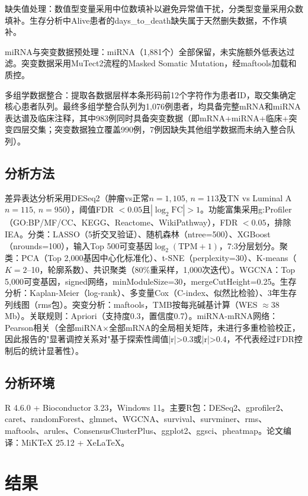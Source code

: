 \documentclass[12pt,a4paper,openany]{ctexbook}
\begin{document}
缺失值处理：数值型变量采用中位数填补以避免异常值干扰，分类型变量采用众数填补。生存分析中Alive患者的days\_to\_death缺失属于天然删失数据，不作填补。

miRNA与突变数据预处理：miRNA（1,881个）全部保留，未实施额外低表达过滤。突变数据采用MuTect2流程的Masked Somatic Mutation，经maftools\cite{mayakonda2018maftools}加载和质控。

多组学数据整合：提取各数据层样本条形码前12个字符作为患者ID，取交集确定核心患者队列。最终多组学整合队列为1,076例患者，均具备完整mRNA和miRNA表达谱及临床注释，其中983例同时具备突变数据（即mRNA+miRNA+临床+突变四层交集；突变数据独立覆盖990例，7例因缺失其他组学数据而未纳入整合队列）。

\section{分析方法}
差异表达分析采用DESeq2\cite{love2014moderated}（肿瘤vs正常$n=1,105$, $n=113$及TN vs Luminal A $n=115$, $n=950$），阈值FDR $<0.05$且$|\log_2\text{FC}|>1$。功能富集采用g:Profiler\cite{kolberg2023gprofiler}（GO:BP/MF/CC、KEGG、Reactome、WikiPathway），FDR $<0.05$，排除IEA。分类：LASSO（5折交叉验证）、随机森林（ntree=500）、XGBoost（nrounds=100），输入Top 500可变基因$\log_2(\text{TPM}+1)$，7:3分层划分。聚类：PCA（Top 2,000基因中心化标准化）、t-SNE（perplexity=30）、K-means（$K=2$--10，轮廓系数）、共识聚类\cite{wilkerson2010consensus}（80\%重采样，1,000次迭代）。WGCNA\cite{langfelder2008wgcna}：Top 5,000可变基因，signed网络，minModuleSize=30，mergeCutHeight=0.25。生存分析：Kaplan-Meier（log-rank）、多变量Cox（C-index、似然比检验）、3年生存列线图（rms包）。突变分析：maftools\cite{mayakonda2018maftools}，TMB按每兆碱基计算（WES $\approx$38 Mb）。关联规则：Apriori（支持度0.3，置信度0.7）。miRNA-mRNA网络：Pearson相关（全部miRNA×全部mRNA的全局相关矩阵，未进行多重检验校正，因此报告的"显著调控关系对"基于探索性阈值|r|>0.3或|r|>0.4，不代表经过FDR控制后的统计显著性）。

\section{分析环境}
R 4.6.0 + Bioconductor 3.23，Windows 11。主要R包：DESeq2、gprofiler2、caret、randomForest、glmnet、WGCNA、survival、survminer、rms、maftools、arules、ConsensusClusterPlus、ggplot2、ggsci、pheatmap。论文编译：MiKTeX 25.12 + XeLaTeX。

\chapter{结果}
\end{document}
